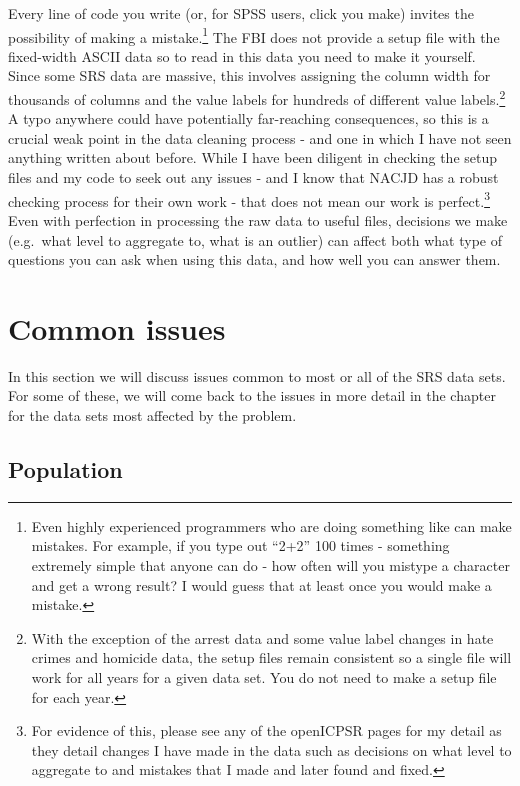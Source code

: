 \documentclass[
]{krantz}
\begin{document}
Every line of code you write (or, for SPSS users, click you
make) invites the possibility of making a
mistake.\footnote{Even highly experienced programmers who
  are doing something like can make mistakes. For example,
  if you type out ``2+2'' 100 times - something extremely
  simple that anyone can do - how often will you mistype a
  character and get a wrong result? I would guess that at
  least once you would make a mistake.} The FBI does not
provide a setup file with the fixed-width ASCII data so to
read in this data you need to make it yourself. Since some
SRS data are massive, this involves assigning the column
width for thousands of columns and the value labels for
hundreds of different value labels.\footnote{With the
  exception of the arrest data and some value label changes
  in hate crimes and homicide data, the setup files remain
  consistent so a single file will work for all years for a
  given data set. You do not need to make a setup file for
  each year.} A typo anywhere could have potentially
far-reaching consequences, so this is a crucial weak point
in the data cleaning process - and one in which I have not
seen anything written about before. While I have been
diligent in checking the setup files and my code to seek out
any issues - and I know that NACJD has a robust checking
process for their own work - that does not mean our work is
perfect.\footnote{For evidence of this, please see any of
  the openICPSR pages for my detail as they detail changes I
  have made in the data such as decisions on what level to
  aggregate to and mistakes that I made and later found and
  fixed.} Even with perfection in processing the raw data to
useful files, decisions we make (e.g.~what level to
aggregate to, what is an outlier) can affect both what type
of questions you can ask when using this data, and how well
you can answer them.

\section{Common issues}\label{common-issues}

In this section we will discuss issues common to most or all
of the SRS data sets. For some of these, we will come back to
the issues in more detail in the chapter for the data sets
most affected by the problem.

\subsection{Population}\label{population}
\end{document}
